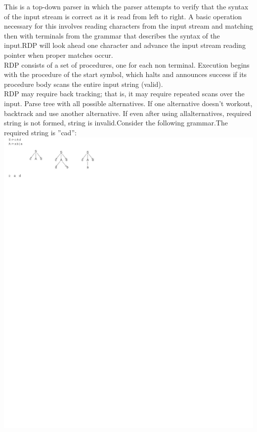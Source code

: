 \documentclass[11pt]{article}
\begin{document}
	\noindent
	This is a top-down parser in which the parser attempts to verify that the syntax of the input stream is correct as it is read from left to right. A basic operation necessary for this  involves reading characters from the input stream and matching then with terminals from the grammar that describes the syntax of the input.RDP will look ahead one character and advance the input stream reading pointer when proper matches occur.\\
	
	RDP consists of a set of procedures, one for each non terminal. Execution begins with the procedure of the start symbol, which halts and announces success if its procedure body scans the entire input string (valid).\\
	
	RDP may require back tracking; that is, it may require repeated scans over the input. Parse tree with all possible alternatives. If one alternative doesn’t workout, backtrack and use another alternative. If even after using allalternatives, required string is not formed, string is invalid.Consider the following grammar.The required string is ”cad”:\\
	
	\includegraphics{image2.png}
	
\end{document}
